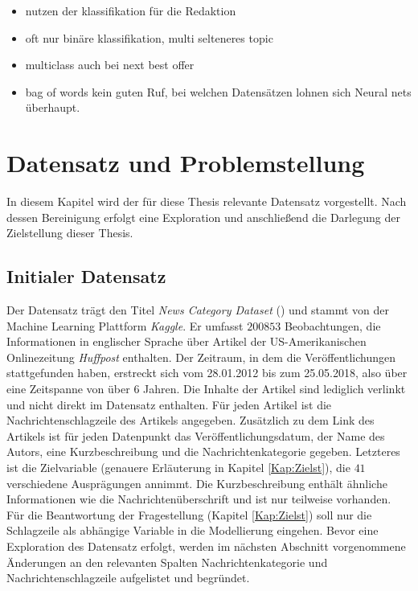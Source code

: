 \documentclass[a4paper,11pt]{article}
\begin{document}
\begin{itemize}
    \item nutzen der klassifikation für die Redaktion
    \item oft nur binäre klassifikation, multi selteneres topic
    \item multiclass auch bei next best offer
    \item bag of words kein guten Ruf, bei welchen Datensätzen lohnen sich Neural nets überhaupt.
\end{itemize}{}

\section{Datensatz und Problemstellung}

In diesem Kapitel wird der für diese Thesis relevante Datensatz vorgestellt. Nach dessen Bereinigung erfolgt eine Exploration und anschließend die Darlegung der Zielstellung dieser Thesis.


\subsection{Initialer Datensatz}

Der Datensatz trägt den Titel \textit{News Category Dataset} (\cite{dataset}) und stammt von der Machine Learning Plattform \textit{Kaggle}. Er umfasst $200853$ Beobachtungen, die Informationen in englischer Sprache über Artikel der US-Amerikanischen Onlinezeitung \textit{Huffpost} enthalten. Der Zeitraum, in dem die Veröffentlichungen stattgefunden haben, erstreckt sich vom 28.01.2012 bis zum 25.05.2018, also über eine Zeitspanne von über $6$ Jahren. Die Inhalte der Artikel sind lediglich verlinkt und nicht direkt im Datensatz enthalten. Für jeden Artikel ist die Nachrichtenschlagzeile des Artikels angegeben. Zusätzlich zu dem Link des Artikels ist für jeden Datenpunkt das Veröffentlichungsdatum, der Name des Autors, eine Kurzbeschreibung und die Nachrichtenkategorie gegeben. Letzteres ist die Zielvariable (genauere Erläuterung in Kapitel \ref{Kap:Zielst}), die $41$ verschiedene Ausprägungen annimmt. Die Kurzbeschreibung enthält ähnliche Informationen wie die Nachrichtenüberschrift und ist nur teilweise vorhanden. Für die Beantwortung der Fragestellung (Kapitel \ref{Kap:Zielst}) soll nur die Schlagzeile als abhängige Variable in die Modellierung eingehen. Bevor eine Exploration des Datensatz erfolgt, werden im nächsten Abschnitt vorgenommene Änderungen an den relevanten Spalten Nachrichtenkategorie und Nachrichtenschlagzeile aufgelistet und begründet.
\end{document}
